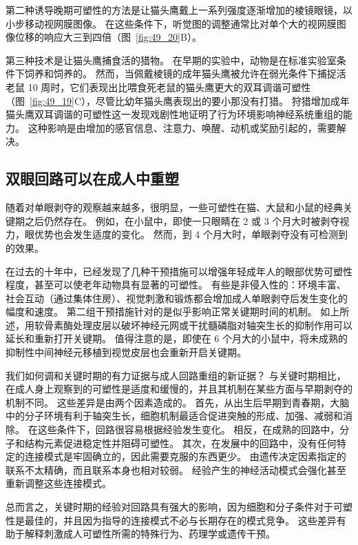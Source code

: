 第二种诱导晚期可塑性的方法是让猫头鹰戴上一系列强度逐渐增加的棱镜眼镜，以小步移动视网膜图像。
在这些条件下，听觉图的调整通常比对单个大的视网膜图像位移的响应大三到四倍（图~\ref{fig:49_20}B）。


第三种技术是让猫头鹰捕食活的猎物。
在早期的实验中，动物是在标准实验室条件下饲养和饲养的。
然而，当佩戴棱镜的成年猫头鹰被允许在弱光条件下捕捉活老鼠 10 周时，它们表现出比喂食死老鼠的猫头鹰更大的双耳调谐可塑性（图~\ref{fig:49_19}C），尽管比幼年猫头鹰表现出的要小那没有打猎。
狩猎增加成年猫头鹰双耳调谐的可塑性这一发现戏剧性地证明了行为环境影响神经系统重组的能力。
这种影响是由增加的感官信息、注意力、唤醒、动机或奖励引起的，需要解决。



\subsection{双眼回路可以在成人中重塑}

随着对单眼剥夺的观察越来越多，很明显，一些可塑性在猫、大鼠和小鼠的经典关键期之后仍然存在。
例如，在小鼠中，即使一只眼睛在 2 或 3 个月大时被剥夺视力，眼优势也会发生适度的变化。
然而，到 4 个月大时，单眼剥夺没有可检测到的效果。


在过去的十年中，已经发现了几种干预措施可以增强年轻成年人的眼部优势可塑性程度，甚至可以使老年动物具有显著的可塑性。
有些是非侵入性的：环境丰富、社会互动（通过集体住房）、视觉刺激和锻炼都会增加成人单眼剥夺后发生变化的幅度和速度。
第二组干预措施针对的是似乎影响正常关键期时间的机制。
如上所述，用软骨素酶处理皮层以破坏神经元网或干扰髓磷脂对轴突生长的抑制作用可以延长和重新打开关键期。
值得注意的是，即使在 6 个月大的小鼠中，将未成熟的抑制性中间神经元移植到视觉皮层也会重新开启关键期。


我们如何调和关键时期的有力证据与成人回路重组的新证据？
与关键时期相比，在成人身上观察到的可塑性是适度和缓慢的，并且其机制在某些方面与早期剥夺的机制不同。
这些差异是由两个因素造成的。
首先，从出生后早期到青春期，大脑中的分子环境有利于轴突生长，细胞机制最适合促进突触的形成、加强、减弱和消除。
在这些条件下，回路很容易根据经验发生变化。
相反，在成熟的回路中，分子和结构元素促进稳定性并阻碍可塑性。
其次，在发展中的回路中，没有任何特定的连接模式是牢固确立的，因此需要克服的东西更少。
由遗传决定因素指定的联系不太精确，而且联系本身也相对较弱。
经验产生的神经活动模式会强化甚至重新调整这些连接模式。


总而言之，关键时期的经验对回路具有强大的影响，因为细胞和分子条件对于可塑性是最佳的，并且因为指导的连接模式不必与长期存在的模式竞争。
这些差异有助于解释刺激成人可塑性所需的特殊行为、药理学或遗传干预。



